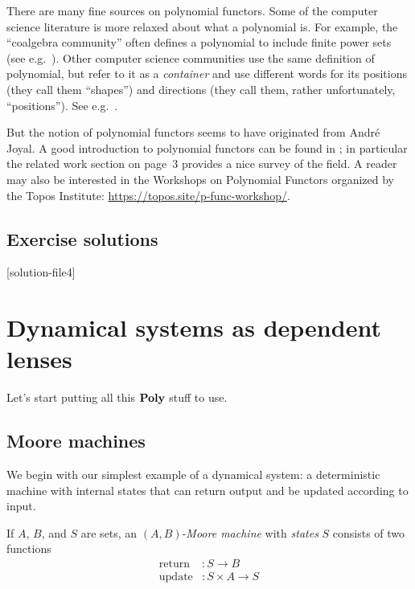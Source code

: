 \documentclass[Book-Poly]{subfiles}
\begin{document}
There are many fine sources on polynomial functors. Some of the computer science literature is more relaxed about what a polynomial is. For example, the ``coalgebra community'' often defines a polynomial to include finite power sets (see e.g.\ \cite{jacobs2017introduction}). Other computer science communities use the same definition of polynomial, but refer to it as a \emph{container} and use different words for its positions (they call them ``shapes'') and directions (they call them, rather unfortunately, ``positions''). See e.g.\ \cite{abbot2003categoriesthesis,abbott2005containers}.

But the notion of polynomial functors seems to have originated from Andr\'{e} Joyal. A good introduction to polynomial functors can be found in \cite{kock2012polynomial}; in particular the related work section on page~3 provides a nice survey of the field. A reader may also be interested in the Workshops on Polynomial Functors organized by the Topos Institute: \url{https://topos.site/p-func-workshop/}.

\section{Exercise solutions}
{\footnotesize
}

[solution-file4]

\chapter{Dynamical systems as dependent lenses} \label{ch.poly.dyn_sys}

Let's start putting all this $\mathbf{Poly}$ stuff to use.

\section{Moore machines}\label{sec.poly.dyn_sys.moore}

We begin with our simplest example of a dynamical system: a deterministic machine with internal states that can return output and be updated according to input.

\begin{definition}\label{def.moore_machine}
If $A$, $B$, and $S$ are sets, an $(A,B)$-\emph{Moore machine} with \emph{states} $S$ consists of two functions
\begin{align*}
	\text{return}&\colon S\to B\\
	\text{update}&\colon S\times A\to S
\end{align*}
\end{definition}
\end{document}
